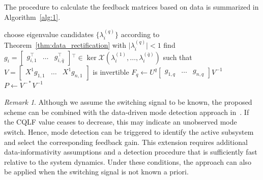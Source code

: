 \documentclass[11pt]{article}
\theoremstyle{plain}
\theoremstyle{definition}
\theoremstyle{remark}
\newtheorem{remark}[theorem]{Remark}
\begin{document}
The procedure to calculate the feedback matrices based on data is summarized in Algorithm~\ref{alg:1}.

\begin{algorithm}
\caption{Data-driven feedback rectification}\label{alg:1}
choose eigenvalue candidates $\{\lambda_i^{(q)}\}$ according to Theorem~\ref{thm:data_rectification} with $\lvert \lambda_i^{(q)}\rvert<1$ \;
find $g_i = \begin{bmatrix}
    g_{i,1}^\top & \dots & g_{i,\bar q}^\top
\end{bmatrix}{}^\top \in \ker\mathcal X(\lambda_i^{(1)},\dots, \lambda_i^{(\bar q)})$ such that
$V=\begin{bmatrix}
    X^1 g_{1,1} & \dots & X^1 g_{n,1}
\end{bmatrix}$ is invertible\;
$F_q \gets U^q \begin{bmatrix}
    g_{1,q} & \dots & g_{n,q}
\end{bmatrix} V^{-1}$ \;
$P \gets V^{-*} V^{-1}$\;
\end{algorithm}

\begin{remark}
Although we assume the switching signal to be known, the proposed scheme can be combined with the data-driven mode detection approach in~\cite{eising2024data}. If the CQLF value ceases to decrease, this may indicate an unobserved mode switch. Hence, mode detection can be triggered to identify the active subsystem and select the corresponding feedback gain. This extension requires additional data-informativity assumptions and a detection procedure that is sufficiently fast relative to the system dynamics. Under these conditions, the approach can also be applied when the switching signal is not known a priori.
\end{remark}
\end{document}
